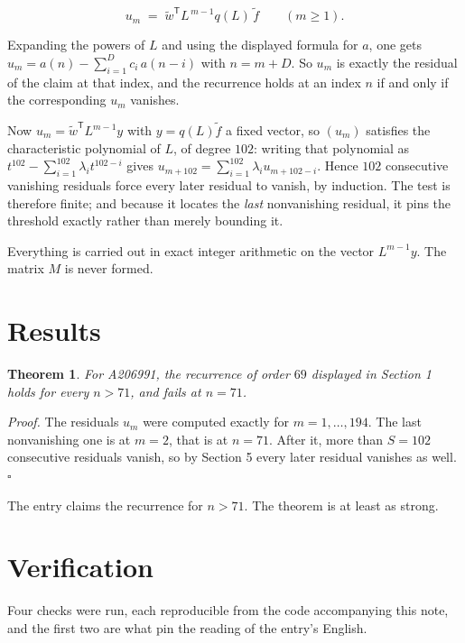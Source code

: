 \documentclass[11pt]{article}
\newtheorem{theorem}{Theorem}
\theoremstyle{definition}
\begin{document}
\[u_m \;=\; \tilde w^{\mathsf T} L^{\,m-1} q(L)\,\tilde f \qquad (m \ge 1).\]

Expanding the powers of $L$ and using the displayed formula for $a$, one gets $u_m = a(n) - \sum_{i=1}^{D} c_i\,a(n-i)$ with $n = m + D$. So $u_m$ is exactly the residual of the claim at that index, and the recurrence holds at an index $n$ if and only if the corresponding $u_m$ vanishes.

Now $u_m = \tilde w^{\mathsf T} L^{m-1} y$ with $y = q(L)\tilde f$ a fixed vector, so $(u_m)$ satisfies the characteristic polynomial of $L$, of degree $102$: writing that polynomial as $t^{102} - \sum_{i=1}^{102} \lambda_i t^{102-i}$ gives $u_{m+102} = \sum_{i=1}^{102} \lambda_i u_{m+102-i}$. Hence $102$ consecutive vanishing residuals force every later residual to vanish, by induction. The test is therefore finite; and because it locates the {\itshape last} nonvanishing residual, it pins the threshold exactly rather than merely bounding it.

Everything is carried out in exact integer arithmetic on the vector $L^{m-1}y$. The matrix $M$ is never formed.

\section{Results}

\begin{theorem} For A206991, the recurrence of order $69$ displayed in Section 1 holds for every $n > 71$, and fails at $n = 71$.\end{theorem}

{\itshape Proof.} The residuals $u_m$ were computed exactly for $m = 1,\dots,194$. The last nonvanishing one is at $m = 2$, that is at $n = 71$. After it, more than $S = 102$ consecutive residuals vanish, so by Section 5 every later residual vanishes as well. $\square$

The entry claims the recurrence for $n > 71$. The theorem is at least as strong.

\section{Verification}

Four checks were run, each reproducible from the code accompanying this note, and the first two are what pin the reading of the entry's English.
\end{document}
